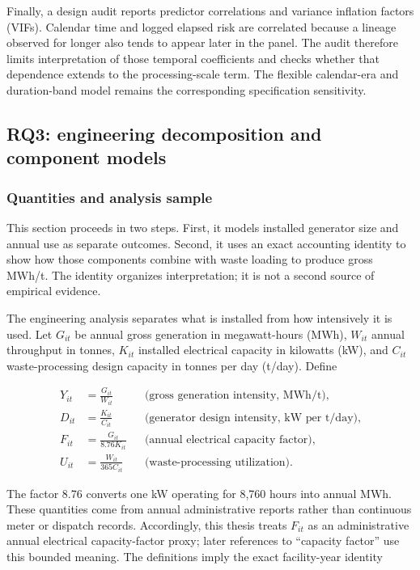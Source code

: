 \documentclass[12pt,letterpaper]{article}
\begin{document}
Finally, a design audit reports predictor correlations and variance inflation
factors (VIFs). Calendar time and logged elapsed risk are correlated because a
lineage observed for longer also tends to appear later in the panel. The audit
therefore limits interpretation of those temporal coefficients and checks
whether that dependence extends to the processing-scale term. The flexible
calendar-era and duration-band model remains the corresponding specification
sensitivity.

\subsection{RQ3: engineering decomposition and component models}

\subsubsection{Quantities and analysis sample}

This section proceeds in two steps. First, it models installed generator size
and annual use as separate outcomes. Second, it uses an exact accounting
identity to show how those components combine with waste loading to produce
gross MWh/t. The identity organizes interpretation; it is not a second source
of empirical evidence.

The engineering analysis separates what is installed from how intensively it is
used. Let $G_{it}$ be annual gross generation in megawatt-hours (MWh), $W_{it}$
annual throughput in tonnes, $K_{it}$ installed electrical capacity in
kilowatts (kW), and $C_{it}$ waste-processing design capacity in tonnes per day
(t/day). Define

\begin{align}
Y_{it}&=\frac{G_{it}}{W_{it}}
&&\text{(gross generation intensity, MWh/t)},
\label{eq:gross-intensity}\\
D_{it}&=\frac{K_{it}}{C_{it}}
&&\text{(generator design intensity, kW per t/day)},
\label{eq:design-intensity}\\
F_{it}&=\frac{G_{it}}{8.76K_{it}}
&&\text{(annual electrical capacity factor)},
\label{eq:capacity-factor}\\
U_{it}&=\frac{W_{it}}{365C_{it}}
&&\text{(waste-processing utilization)}.
\label{eq:waste-utilization}
\end{align}

The factor 8.76 converts one kW operating for 8,760 hours into annual MWh. These
quantities come from annual administrative reports rather than continuous meter
or dispatch records. Accordingly, this thesis treats $F_{it}$ as an
administrative annual electrical capacity-factor proxy; later references to
``capacity factor'' use this bounded meaning. The definitions imply the exact
facility-year identity
\end{document}
